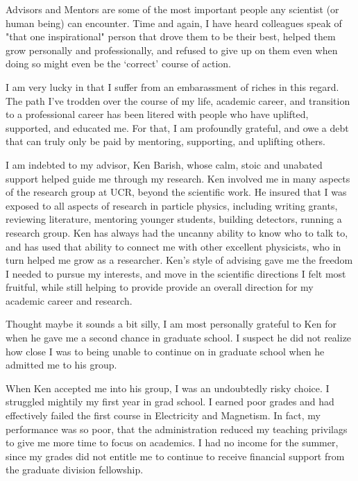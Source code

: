 Advisors and Mentors are some of the most important people any scientist (or
human being) can encounter. Time and again, I have heard colleagues speak of
"that one inspirational" person that drove them to be their best, helped them
grow personally and professionally, and refused to give up on them even when
doing so might even be the `correct' course of action.

I am very lucky in that I suffer from an embarassment of riches in this regard.
The path I've trodden over the course of my life, academic career, and
transition to a professional career has been litered with people who have
uplifted, supported, and educated me. For that, I am profoundly grateful, and
owe a debt that can truly only be paid by mentoring, supporting, and uplifting
others.

I am indebted to my advisor, Ken Barish, whose calm, stoic and unabated support
helped guide me through my research. Ken involved me in many aspects of the
research group at UCR, beyond the scientific work. He insured that I was
exposed to all aspects of research in particle physics, including writing
grants, reviewing literature, mentoring younger students, building detectors,
running a research group.  Ken has always had the uncanny ability to know who
to talk to, and has used that ability to connect me with other excellent
physicists, who in turn helped me grow as a researcher. Ken's style of advising
gave me the freedom I needed to pursue my interests, and move in the scientific
directions I felt most fruitful, while still helping to provide provide an
overall direction for my academic career and research. 

Thought maybe it sounds a bit silly, I am most personally grateful to Ken for
when he gave me a second chance in graduate school. I suspect he did not
realize how close I was to being unable to continue on in graduate school when
he admitted me to his group.

When Ken accepted me into his group, I was an undoubtedly risky choice. I
struggled mightily my first year in grad school.  I earned poor grades and had
effectively failed the first course in Electricity and Magnetism. In fact, my
performance was so poor, that the administration reduced my teaching privilags
to give me more time to focus on academics. I had no income for the summer,
since my grades did not entitle me to continue to receive financial support
from the graduate division fellowship.

